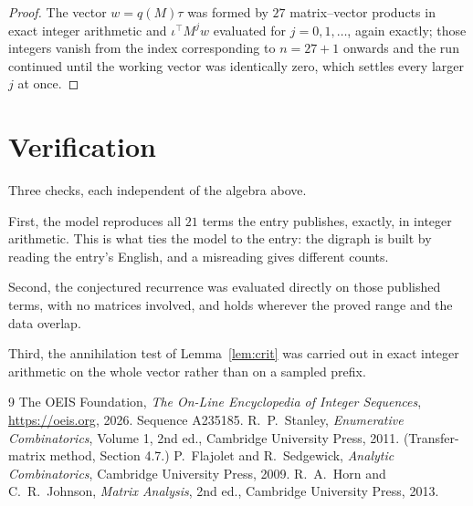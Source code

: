\documentclass[11pt,a4paper]{article}
\theoremstyle{plain}
\theoremstyle{definition}
\begin{document}
\begin{proof}
The vector $w=q(M)\tau$ was formed by $27$ matrix--vector products in exact integer
arithmetic and $\iota^{\!\top}M^{j}w$ evaluated for $j=0,1,\dots$, again exactly; those
integers vanish from the index corresponding to $n=27+1$ onwards and the run continued
until the working vector was identically zero, which settles every larger $j$ at once.
\end{proof}

\section{Verification}

Three checks, each independent of the algebra above.

First, the model reproduces all $21$ terms the entry publishes, exactly, in integer
arithmetic. This is what ties the model to the entry: the digraph is built by reading the
entry's English, and a misreading gives different counts.

Second, the conjectured recurrence was evaluated directly on those published terms, with no
matrices involved, and holds wherever the proved range and the data overlap.

Third, the annihilation test of Lemma~\ref{lem:crit} was carried out in exact integer
arithmetic on the whole vector rather than on a sampled prefix.

\begin{thebibliography}{9}
 The OEIS Foundation, \emph{The On-Line Encyclopedia of Integer
Sequences}, \url{https://oeis.org}, 2026. Sequence A235185.
 R.~P.~Stanley, \emph{Enumerative Combinatorics}, Volume 1, 2nd ed.,
Cambridge University Press, 2011. (Transfer-matrix method, Section 4.7.)
 P.~Flajolet and R.~Sedgewick, \emph{Analytic Combinatorics}, Cambridge
University Press, 2009.
 R.~A.~Horn and C.~R.~Johnson, \emph{Matrix Analysis}, 2nd ed., Cambridge
University Press, 2013.
\end{thebibliography}
\end{document}
